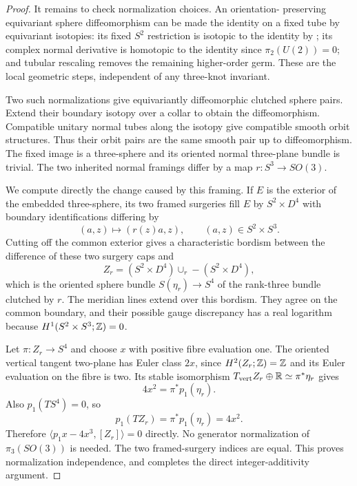 \begin{proof}
It remains to check normalization choices. An orientation-
preserving equivariant sphere diffeomorphism can be made the
identity on a fixed tube by equivariant isotopies: its fixed
$S^2$ restriction is isotopic to the identity by
\citet[Theorem A]{Smale1959E}; its complex normal derivative
is homotopic to the identity since $\pi_2(U(2))=0$; and
tubular rescaling removes the remaining higher-order germ.
These are the local geometric steps, independent of any
three-knot invariant.

Two such normalizations give equivariantly diffeomorphic
clutched sphere pairs. Extend their boundary isotopy over a
collar to obtain the diffeomorphism. Compatible unitary normal
tubes along the isotopy give compatible smooth orbit structures.
Thus their orbit pairs are the same smooth pair up to
diffeomorphism. The fixed image is a three-sphere and its
oriented normal three-plane bundle is trivial. The two inherited
normal framings differ by a map $r:S^3\to SO(3)$.

We compute directly the change caused by this framing. If
$E$ is the exterior of the embedded three-sphere, its two
framed surgeries fill $E$ by $S^2\times D^4$ with boundary
identifications differing by
\[
 (a,z)\longmapsto(r(z)a,z),\qquad(a,z)\in S^2\times S^3.
\]
Cutting off the common exterior gives a characteristic bordism
between the difference of these two surgery caps and
\[
 Z_r=(S^2\times D^4)\cup_r-(S^2\times D^4),
\]
which is the oriented sphere bundle $S(\eta_r)\to S^4$ of
the rank-three bundle clutched by $r$. The meridian lines
extend over this bordism. They agree on the common boundary,
and their possible gauge discrepancy has a real logarithm
because $H^1(S^2\times S^3;\mathbb Z)=0$.

Let $\pi:Z_r\to S^4$ and choose $x$ with positive fibre
evaluation one. The oriented vertical tangent two-plane has
Euler class $2x$, since $H^2(Z_r;\mathbb Z)=\mathbb Z$ and its Euler
evaluation on the fibre is two. Its stable isomorphism
$T_{\mathrm{vert}}Z_r\oplus\mathbb R\simeq\pi^*\eta_r$ gives
\[
 4x^2=\pi^*p_1(\eta_r).
\]
Also $p_1(TS^4)=0$, so
\[
 p_1(TZ_r)=\pi^*p_1(\eta_r)=4x^2.
\]
Therefore $\langle p_1x-4x^3,[Z_r]\rangle=0$ directly.
No generator normalization of $\pi_3(SO(3))$ is needed.
The two framed-surgery indices are equal. This proves
normalization independence, and completes the direct
integer-additivity argument.
\end{proof}
